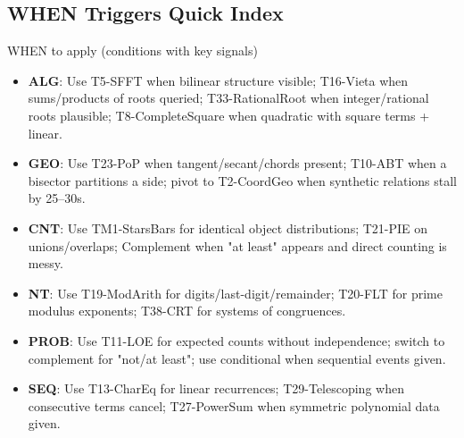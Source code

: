 \documentclass{article}
\begin{document}
\subsection*{WHEN Triggers Quick Index}
\begin{classifybox}{WHEN to apply (conditions with key signals)}
\begin{itemize}[nosep]
\item \textbf{ALG}: Use T5-SFFT when bilinear structure visible; T16-Vieta when sums/products of roots queried; T33-RationalRoot when integer/rational roots plausible; T8-CompleteSquare when quadratic with square terms + linear.
\item \textbf{GEO}: Use T23-PoP when tangent/secant/chords present; T10-ABT when a bisector partitions a side; pivot to T2-CoordGeo when synthetic relations stall by 25--30s.
\item \textbf{CNT}: Use TM1-StarsBars for identical object distributions; T21-PIE on unions/overlaps; Complement when "at least" appears and direct counting is messy.
\item \textbf{NT}: Use T19-ModArith for digits/last-digit/remainder; T20-FLT for prime modulus exponents; T38-CRT for systems of congruences.
\item \textbf{PROB}: Use T11-LOE for expected counts without independence; switch to complement for "not/at least"; use conditional when sequential events given.
\item \textbf{SEQ}: Use T13-CharEq for linear recurrences; T29-Telescoping when consecutive terms cancel; T27-PowerSum when symmetric polynomial data given.
\end{itemize}
\end{classifybox}
\end{document}
